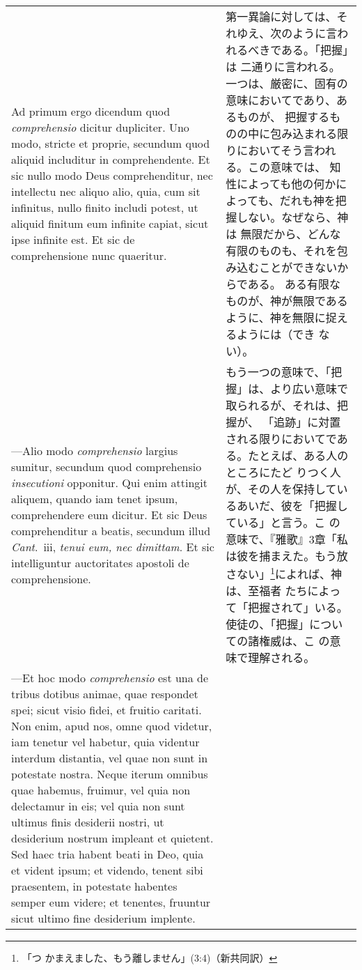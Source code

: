 \documentclass[10pt]{jsarticle} %
\begin{document}
\begin{longtable}{p{21em}p{21em}}
\\


{\sc Ad primum ergo dicendum} quod {\it comprehensio} dicitur
dupliciter. Uno modo, stricte et proprie, secundum quod aliquid
includitur in comprehendente. Et sic nullo modo Deus comprehenditur,
nec intellectu nec aliquo alio, quia, cum sit infinitus, nullo finito
includi potest, ut aliquid finitum eum infinite capiat, sicut ipse
infinite est. Et sic de comprehensione nunc quaeritur.

&

第一異論に対しては、それゆえ、次のように言われるべきである。「把握」は
二通りに言われる。一つは、厳密に、固有の意味においてであり、あるものが、
把握するものの中に包み込まれる限りにおいてそう言われる。この意味では、
知性によっても他の何かによっても、だれも神を把握しない。なぜなら、神は
無限だから、どんな有限のものも、それを包み込むことができないからである。
ある有限なものが、神が無限であるように、神を無限に捉えるようには（でき
ない）。

\\



---Alio modo {\it comprehensio} largius sumitur, secundum quod
comprehensio {\it insecutioni} opponitur. Qui enim attingit aliquem,
quando iam tenet ipsum, comprehendere eum dicitur. Et sic Deus
comprehenditur a beatis, secundum illud {\it Cant}.\ {\sc iii}, {\it
tenui eum, nec dimittam}. Et sic intelliguntur auctoritates apostoli
de comprehensione.

&

もう一つの意味で、「把握」は、より広い意味で取られるが、それは、把握が、
「追跡」に対置される限りにおいてである。たとえば、ある人のところにたど
りつく人が、その人を保持しているあいだ、彼を「把握している」と言う。こ
の意味で、『雅歌』3章「私は彼を捕まえた。もう放さない」\footnote{「つ
かまえました、もう離しません」(3:4)（新共同訳）}によれば、神は、至福者
たちによって「把握されて」いる。使徒の、「把握」についての諸権威は、こ
の意味で理解される。


\\



---Et hoc modo {\it comprehensio} est una de tribus dotibus animae,
quae respondet spei; sicut visio fidei, et fruitio caritati. Non enim,
apud nos, omne quod videtur, iam tenetur vel habetur, quia videntur
interdum distantia, vel quae non sunt in potestate nostra. Neque
iterum omnibus quae habemus, fruimur, vel quia non delectamur in eis;
vel quia non sunt ultimus finis desiderii nostri, ut desiderium
nostrum impleant et quietent. Sed haec tria habent beati in Deo, quia
et vident ipsum; et videndo, tenent sibi praesentem, in potestate
habentes semper eum videre; et tenentes, fruuntur sicut ultimo fine
desiderium implente.



\end{longtable}
\end{document}
